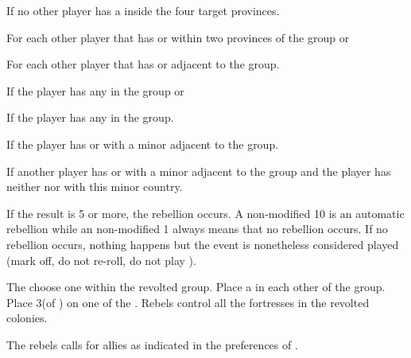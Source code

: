 \begin{modlist}
\item[\bonus{-5}] If no other player has a \COL inside the four target
  provinces.
\item[\bonus{+1}] For each other player that has \COL or \TP within two
  provinces of the group or
\item[\bonus{+2}] For each other player that has \COL or \TP adjacent to the
  group.
\item[\bonus{-1}] If the player has any \LD in the group or
\item[\bonus{-2}] If the player has any \ARMY in the group.
\item[\bonus{-2}] If the player has \dipFR or \dipAT with a minor adjacent to
  the group.
\item[\bonus{+3}] If another player has \dipFR or \dipAT with a minor adjacent
  to the group and the player has neither \dipFR nor \dipAT with this minor
  country.
\end{modlist}
\aparag \label{pVII:IW:Test} If the result is 5 or more, the rebellion
occurs. A non-modified 10 is an automatic rebellion while an non-modified 1
always means that no rebellion occurs.
\bparag If no rebellion occurs, nothing happens but the event is nonetheless
considered played (mark off, do not re-roll, do not play \RD).





\phevnt
\aparag The \MAJ choose one \COL within the revolted group. Place a \REVOLT
\facemoins in each other \COL of the group.
\bparag Place 3\LD (of \paysusa) on one of the \REVOLT .
\bparag Rebels control all the fortresses in the revolted colonies.

\phdipl
\aparag The rebels calls for allies as indicated in the preferences of
\paysusa.

